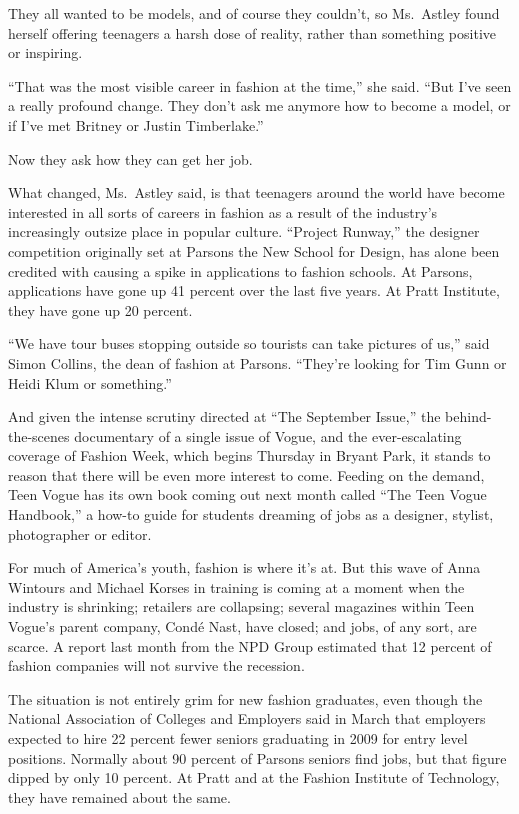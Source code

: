 ﻿\documentclass[12pt]{article}
\begin{document}
They all wanted to be models, and of course they couldn't, so Ms.~Astley found herself offering
teenagers a harsh dose of reality, rather than something positive or inspiring.

``That was the most visible career in fashion at the time,'' she said. ``But I've seen a really
profound change. They don't ask me anymore how to become a model, or if I've met Britney or Justin
Timberlake.''

Now they ask how they can get her job.

What changed, Ms.~Astley said, is that teenagers around the world have become interested in all
sorts of careers in fashion as a result of the industry's increasingly outsize place in popular
culture. ``Project Runway,'' the designer competition originally set at Parsons the New School for
Design, has alone been credited with causing a spike in applications to fashion schools. At Parsons,
applications have gone up 41 percent over the last five years. At Pratt Institute, they have gone up
20 percent.

``We have tour buses stopping outside so tourists can take pictures of us,'' said Simon Collins, the
dean of fashion at Parsons. ``They're looking for Tim Gunn or Heidi Klum or something.''

And given the intense scrutiny directed at ``The September Issue,'' the behind-the-scenes
documentary of a single issue of Vogue, and the ever-escalating coverage of Fashion Week, which
begins Thursday in Bryant Park, it stands to reason that there will be even more interest to come.
Feeding on the demand, Teen Vogue has its own book coming out next month called ``The Teen Vogue
Handbook,'' a how-to guide for students dreaming of jobs as a designer, stylist, photographer or
editor.

For much of America's youth, fashion is where it's at. But this wave of Anna Wintours and Michael
Korses in training is coming at a moment when the industry is shrinking; retailers are collapsing;
several magazines within Teen Vogue's parent company, Cond\'e Nast, have closed; and jobs, of any
sort, are scarce. A report last month from the NPD Group estimated that 12 percent of fashion
companies will not survive the recession.

The situation is not entirely grim for new fashion graduates, even though the National Association
of Colleges and Employers said in March that employers expected to hire 22 percent fewer seniors
graduating in 2009 for entry level positions. Normally about 90 percent of Parsons seniors find
jobs, but that figure dipped by only 10 percent. At Pratt and at the Fashion Institute of
Technology, they have remained about the same.
\end{document}
